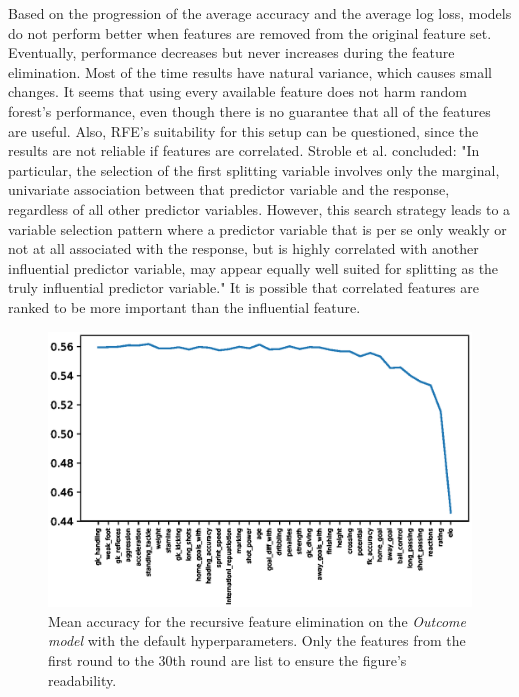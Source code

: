 Based on the progression of the average accuracy and the average log loss, models do not perform better when features are removed from the original feature set. Eventually, performance decreases but never increases during the feature elimination. Most of the time results have natural variance, which causes small changes. It seems that using every available feature does not harm random forest's performance, even though there is no guarantee that all of the features are useful. Also, RFE's suitability for this setup can be questioned, since the results are not reliable if features are correlated. Stroble et al. concluded: "In particular, the selection of the first splitting variable involves only the marginal, univariate association between that predictor variable and the response, regardless of all other predictor variables. However, this search strategy leads to a variable selection pattern where a predictor variable that is per se only weakly or not at all associated with the response, but is highly correlated with another influential predictor variable, may appear equally well suited for splitting as the truly influential predictor variable." It is possible that correlated features are ranked to be more important than the influential feature.
\begin{figure}[H]
    \centering
    \includegraphics[width=1\textwidth]{img/default_avg_accuracy.eps}
    \caption{Mean accuracy for the recursive feature elimination on the \textit{Outcome model} with the default hyperparameters. Only the features from the first round to the 30th round are list to ensure the figure's readability.}
    \label{fig:def_avg_accu}
\end{figure}

